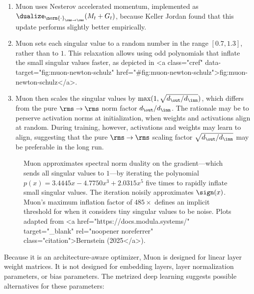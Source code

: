 \begin{enumerate}
    \item Muon uses Nesterov accelerated momentum, implemented as $\dualize_{\norm{\cdot}_{\rms \to \rms}}(M_t + G_t)$, because Keller Jordan found that this update performs slightly better empirically.
    \item Muon sets each singular value to a random number in the range $[0.7, 1.3]$, rather than to $1$. This relaxation allows using odd polynomials that inflate the small singular values faster, as depicted in <a class="cref" data-target="fig:muon-newton-schulz" href="#fig:muon-newton-schulz">fig:muon-newton-schulz</a>.
    \item Muon then scales the singular values by $\max(1, \sqrt{d_\out / d_\inn})$, which differs from the pure $\rms\to\rms$ norm factor $d_\out / d_\inn$. The rationale may be to perserve activation norms at initialization, when weights and activations align at random. During training, however, activations and weights may learn to align, suggesting that the pure $\rms \to \rms$ scaling factor $\sqrt{d_\out / d_\inn}$ may be preferable in the long run.
\end{enumerate}

\begin{figure}[t]
    \centering
    \subfloat{
        
    }
    \hspace{0.03\textwidth}
    \subfloat{
        
    }
    \caption{Muon approximates spectral norm duality on the gradient---which sends all singular values to $1$---by iterating the polynomial $p(x) = 3.4445x - 4.7750x^3 + 2.0315x^5$ five times to rapidly inflate small singular values. The iteration noisily approximates $\sign(x)$. Muon's maximum inflation factor of $485\times$ defines an implicit threshold for when it considers tiny singular values to be noise. Plots adapted from <a href="https://docs.modula.systems/" target="_blank" rel="noopener noreferrer" class="citation">Bernstein (2025</a>).}  %
    \label{fig:muon-newton-schulz}
\end{figure}

Because it is an architecture-aware optimizer, Muon is designed for linear layer weight matrices. It is not designed for embedding layers, layer normalization parameters, or bias parameters. The metrized deep learning suggests possible alternatives for these parameters:

